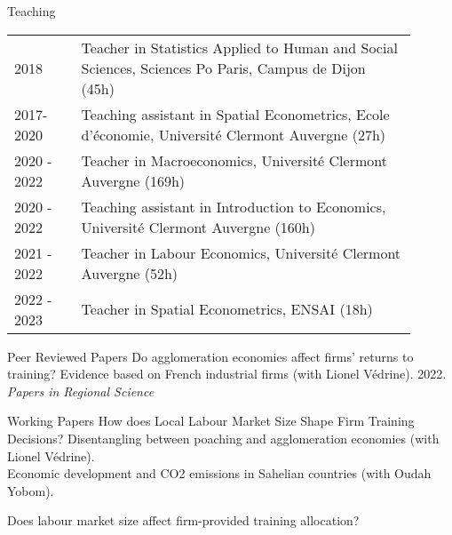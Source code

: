 \documentclass{resume} %
\begin{document}
\begin{rSection}{Teaching}
\begin{table}[H]
{\def\arraystretch{1.5}\tabcolsep=0pt
\begin{tabular}{p{0.15\linewidth}p{0.75\linewidth}}
2018 &  Teacher in Statistics Applied to Human and Social Sciences, Sciences Po Paris, Campus de Dijon (45h)\\
2017-2020 &  Teaching assistant in Spatial Econometrics, Ecole d'économie, Université Clermont Auvergne (27h)\\
2020 - 2022 & Teacher in Macroeconomics, Université Clermont Auvergne (169h)\\
2020 - 2022 & Teaching assistant in Introduction to Economics, Université Clermont Auvergne (160h)\\

2021 - 2022 & Teacher in Labour Economics, Université Clermont Auvergne (52h)\\
2022 - 2023 &  Teacher in Spatial Econometrics, ENSAI (18h)\\
\end{tabular}%
}
\end{table}
\end{rSection}
\vspace*{-7mm}
\begin{rSection}{Peer Reviewed Papers}
\vspace*{4mm}
Do agglomeration economies affect firms’ returns to training? Evidence based on French industrial firms (with Lionel Védrine). 2022. \textit{Papers in Regional Science}
\end{rSection}
\begin{rSection}{Working Papers}
\vspace*{4mm}
How does Local Labour Market Size Shape Firm Training Decisions? Disentangling between poaching and agglomeration economies (with Lionel Védrine).\\

Economic development and CO2 emissions in Sahelian countries (with Oudah Yobom).

Does labour market size affect firm-provided training allocation?\\
\end{rSection}
\end{document}
